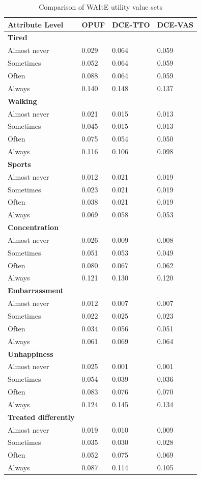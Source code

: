 \documentclass[
  number,
  preprint]{elsarticle}
\begin{document}
\begin{longtable}[]{@{}llll@{}}

\caption{\label{tbl-WAItEvalsets}Comparison of WAItE utility value sets}

\tabularnewline

\toprule\noalign{}
Attribute Level & OPUF & DCE-TTO & DCE-VAS \\
\midrule\noalign{}
\endhead
\bottomrule\noalign{}
\endlastfoot
\textbf{Tired} & \textbf{} & \textbf{} & \textbf{} \\
Almost never & 0.029 & 0.064 & 0.059 \\
Sometimes & 0.052 & 0.064 & 0.059 \\
Often & 0.088 & 0.064 & 0.059 \\
Always & 0.140 & 0.148 & 0.137 \\
\textbf{Walking} & \textbf{} & \textbf{} & \textbf{} \\
Almost never & 0.021 & 0.015 & 0.013 \\
Sometimes & 0.045 & 0.015 & 0.013 \\
Often & 0.075 & 0.054 & 0.050 \\
Always & 0.116 & 0.106 & 0.098 \\
\textbf{Sports} & \textbf{} & \textbf{} & \textbf{} \\
Almost never & 0.012 & 0.021 & 0.019 \\
Sometimes & 0.023 & 0.021 & 0.019 \\
Often & 0.038 & 0.021 & 0.019 \\
Always & 0.069 & 0.058 & 0.053 \\
\textbf{Concentration} & \textbf{} & \textbf{} & \textbf{} \\
Almost never & 0.026 & 0.009 & 0.008 \\
Sometimes & 0.051 & 0.053 & 0.049 \\
Often & 0.080 & 0.067 & 0.062 \\
Always & 0.121 & 0.130 & 0.120 \\
\textbf{Embarrassment} & \textbf{} & \textbf{} & \textbf{} \\
Almost never & 0.012 & 0.007 & 0.007 \\
Sometimes & 0.022 & 0.025 & 0.023 \\
Often & 0.034 & 0.056 & 0.051 \\
Always & 0.061 & 0.069 & 0.064 \\
\textbf{Unhappiness} & \textbf{} & \textbf{} & \textbf{} \\
Almost never & 0.025 & 0.001 & 0.001 \\
Sometimes & 0.054 & 0.039 & 0.036 \\
Often & 0.083 & 0.076 & 0.070 \\
Always & 0.124 & 0.145 & 0.134 \\
\textbf{Treated differently} & \textbf{} & \textbf{} & \textbf{} \\
Almost never & 0.019 & 0.010 & 0.009 \\
Sometimes & 0.035 & 0.030 & 0.028 \\
Often & 0.052 & 0.075 & 0.069 \\
Always & 0.087 & 0.114 & 0.105 \\

\end{longtable}


  
\end{document}
